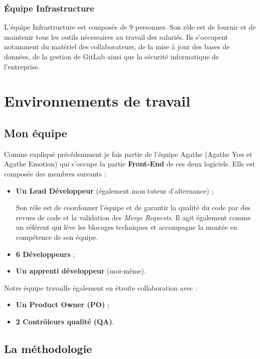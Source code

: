 \documentclass{article}
\begin{document}
\subsubsection{Équipe Infrastructure}

L'équipe Infrastructure est composée de 9 personnes. Son rôle est de fournir et de maintenir tous les outils nécessaires au travail des salariés. Ils s'occupent notamment du matériel des collaborateurs, de la mise à jour des bases de données, de la gestion de GitLab ainsi que la sécurité informatique de l'entreprise.

\section{Environnements de travail}

\subsection{Mon équipe}

Comme expliqué précédemment je fais partie de l'équipe Agathe (Agathe You et Agathe Emotion)
qui s'occupe la partie \textbf{Front-End} de ces deux logiciels. Elle est composée des membres suivants :

\begin{itemize}
    \item \textbf{Un Lead Développeur} (également mon tuteur d'alternance) ;

         Son rôle est de coordonner l'équipe et de garantir la qualité du code par des revues de code et la validation des \textit{Merge Requests}. Il agit également comme un référent qui lève les blocages techniques et accompagne la montée en compétence de son équipe.
         
    \item \textbf{6 Développeurs} ;
    \item \textbf{Un apprenti développeur} (moi-même).
\end{itemize}

Notre équipe travaille également en étroite collaboration avec :

\begin{itemize}
    \item \textbf{Un Product Owner (PO)} ;
    \item \textbf{2 Contrôleurs qualité (QA)}.
\end{itemize}

\subsection{La méthodologie}
\end{document}
